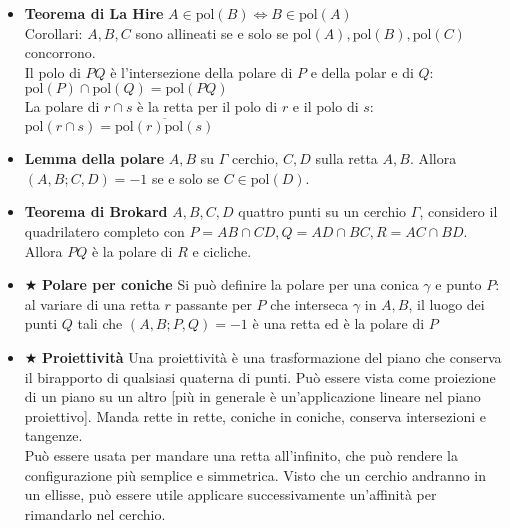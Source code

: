 \begin{itemize}
\item\textbf{Teorema di La Hire} $A \in \text{pol}(B) \iff B \in \text{pol}(A)$\\
Corollari: $A,B,C$ sono allineati se e solo se $\text{pol}(A), \text{pol}(B), \text{pol}(C)$ concorrono.\\
Il polo di $PQ$ è l'intersezione della polare di $P$ e della polar e di $Q$: $\text{pol}(P)\cap \text{pol}(Q)= \text{pol}(PQ)$\\
La polare di $r\cap s$ è la retta per il polo di $r$ e il polo di $s$:  $\text{pol}(r\cap s)= \overline{\text{pol}(r)\text{pol}(s)}$\\

\item \textbf{Lemma della polare}
$A,B$ su $\Gamma$ cerchio, $C,D$ sulla retta $A,B$. Allora $(A,B;C,D)=-1$ se e solo se $C \in \text{pol}(D)$.

\item \textbf{Teorema di Brokard}
$A,B,C,D$ quattro punti su un cerchio $\Gamma$, considero il quadrilatero completo con $P=AB\cap CD, Q=AD\cap BC, R=AC\cap BD$. Allora $PQ$ è la polare di $R$ e cicliche.

\item $\bigstar$ \textbf{Polare per coniche} 
Si può definire la polare per una conica $\gamma$ e punto $P$: al variare di una retta $r$ passante per $P$ che interseca $\gamma$ in $A,B$, il luogo dei punti $Q$ tali che $(A,B;P,Q)=-1$ è una retta ed è la polare di $P$

\item $\bigstar$ \textbf{Proiettività} Una proiettività è una trasformazione del piano che conserva il birapporto di qualsiasi quaterna di punti. Può essere vista come proiezione di un piano su un altro [più in generale è un'applicazione lineare nel piano proiettivo]. Manda rette in rette, coniche in coniche, conserva intersezioni e tangenze.\\
Può essere usata per mandare una retta all'infinito, che può rendere la configurazione più semplice e simmetrica. Visto che un cerchio andranno in un ellisse, può essere utile applicare successivamente un'affinità per rimandarlo nel cerchio.

\end{itemize}



